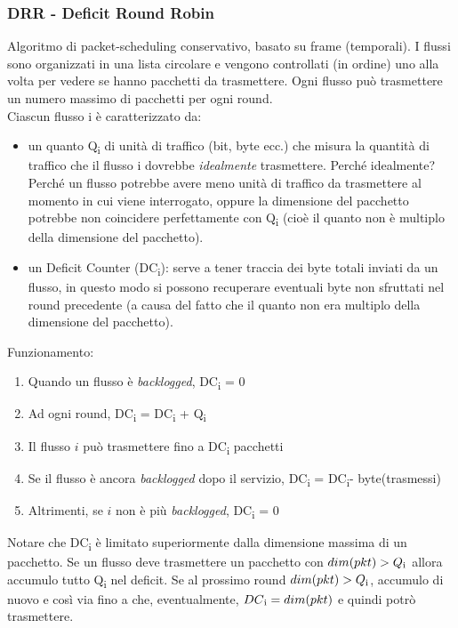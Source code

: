 \documentclass{article}
\begin{document}
\subsubsection{DRR - Deficit Round Robin}
Algoritmo di packet-scheduling conservativo, basato su frame (temporali). I flussi sono organizzati in una lista circolare e vengono controllati (in ordine) uno alla volta per vedere se hanno pacchetti da trasmettere. Ogni flusso può trasmettere un numero massimo di pacchetti per ogni round.\\
Ciascun flusso i è caratterizzato da:
\begin{itemize}
    \item un quanto Q\textsubscript{i} di unità di traffico (bit, byte ecc.) che misura la quantità di traffico che il flusso i dovrebbe \textit{idealmente} trasmettere. Perché idealmente? Perché un flusso potrebbe avere meno unità di traffico da trasmettere al momento in cui viene interrogato, oppure la dimensione del pacchetto potrebbe non coincidere perfettamente con Q\textsubscript{i} (cioè il quanto non è multiplo della dimensione del pacchetto).
    \item un Deficit Counter (DC\textsubscript{i}): serve a tener traccia dei byte totali inviati da un flusso, in questo modo si possono recuperare eventuali byte non sfruttati nel round precedente (a causa del fatto che il quanto non era multiplo della dimensione del pacchetto).
\end{itemize}
Funzionamento:
\begin{enumerate}
    \item Quando un flusso è \textit{backlogged}, DC\textsubscript{i} = 0
    \item Ad ogni round, DC\textsubscript{i} = DC\textsubscript{i} + Q\textsubscript{i}
    \item Il flusso \(i\) può trasmettere fino a DC\textsubscript{i} pacchetti
    \item Se il flusso è ancora \textit{backlogged} dopo il servizio, DC\textsubscript{i} = DC\textsubscript{i}- byte(trasmessi)
    \item Altrimenti, se \(i\) non è più \textit{backlogged}, DC\textsubscript{i} = 0
\end{enumerate}
Notare che DC\textsubscript{i} è limitato superiormente dalla dimensione massima di un pacchetto. Se un flusso deve trasmettere un pacchetto con \( dim(pkt) > Q\textsubscript{i} \) allora accumulo tutto Q\textsubscript{i} nel deficit. Se al prossimo round \( dim(pkt) > Q\textsubscript{i} \), accumulo di nuovo e così via fino a che, eventualmente, \( DC\textsubscript{i} = dim(pkt) \) e quindi potrò trasmettere.\\
\newpage
\end{document}
